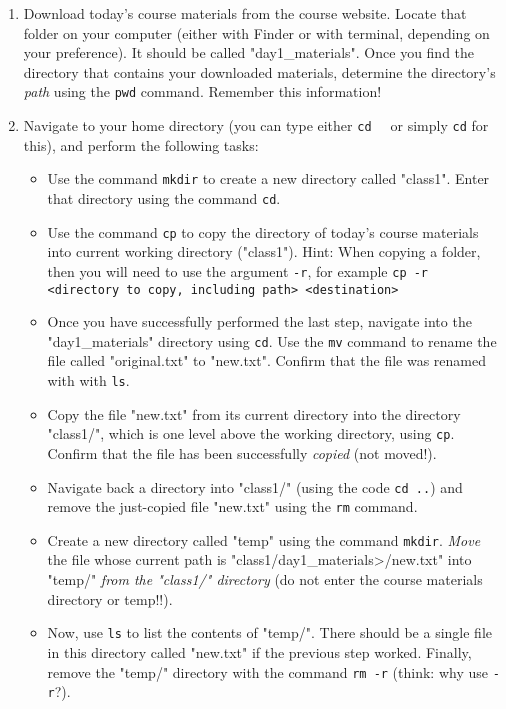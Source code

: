 \documentclass{article}[12pt]
\newcommand{\code}[1]{\texttt{#1}}  %
\begin{document}
    \begin{enumerate}
        \item Download today's course materials from the course website. Locate that folder on your computer (either with Finder or with terminal, depending on your preference). It should be called "day1\_materials". Once you find the directory that contains your downloaded materials, determine the directory's \emph{path} using the \code{pwd} command. Remember this information!
    
        \item Navigate to your home directory (you can type either \code{cd ~} or simply \code{cd} for this), and perform the following tasks:
        \begin{itemize}
            \item Use the command \code{mkdir} to create a new directory called "class1". Enter that directory using the command \code{cd}.
                        
            \item Use the command \code{cp} to copy the directory of today's course materials into current working directory ("class1"). Hint: When copying a folder, then you will need to use the argument \code{-r}, for example \code{cp -r <directory to copy, including path> <destination>}
        
            \item Once you have successfully performed the last step, navigate into the "day1\_materials" directory using \code{cd}. Use the \code{mv} command to rename the file called "original.txt" to "new.txt". Confirm that the file was renamed with with \code{ls}.
            
            \item Copy the file "new.txt" from its current directory into the directory "class1/", which is one level above the working directory, using \code{cp}. Confirm that the file has been successfully \emph{copied} (not moved!).
        
            \item Navigate back a directory into "class1/" (using the code \code{cd ..}) and remove the just-copied file "new.txt" using the \code{rm} command.
        
            \item Create a new directory called "temp" using the command \code{mkdir}. \emph{Move} the file whose current path is "class1/day1\_materials>/new.txt" into "temp/" \emph{from the "class1/" directory} (do not enter the course materials directory or temp!!). 
        
            \item Now, use \code{ls} to list the contents of "temp/". There should be a single file in this directory called "new.txt" if the previous step worked. Finally, remove the "temp/" directory with the command \code{rm -r} (think: why use \code{-r}?).        
        \end{itemize}
    \end{enumerate} 
\end{document}
